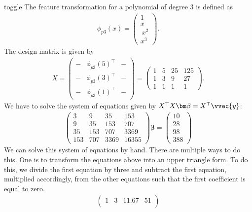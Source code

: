 \documentclass[letterpaper,10pt,english]{jupyterBook}
\begin{document}
\begin{enumerate}
\begin{enumerate}
\begin{sphinxuseclass}{toggle}
\sphinxAtStartPar
The feature transformation for a polynomial of degree 3 is defined as
\begin{equation*}
\begin{split}\phi_{p3}(x)=\begin{pmatrix}
1\\x \\\ x^2 \\ x^3
\end{pmatrix}.\end{split}
\end{equation*}
The design matrix is given by
\begin{align*}
X = \begin{pmatrix}
- & \phi_{p3}(5)^\top & -\\
- & \phi_{p3}(3)^\top & -\\
- & \phi_{p3}(1)^\top & -
\end{pmatrix}
=
\begin{pmatrix}
1 & 5 & 25 & 125\\ 
1 & 3 & 9 & 27\\ 
1 & 1 & 1 & 1
\end{pmatrix}.
\end{align*}
\sphinxAtStartPar
We have to solve the system of equations given by \(X^\top X \bm\beta = X^\top \vvec{y}\):
\begin{align*}
\begin{pmatrix}
3 &     9 &    35 &   153\\
9 &    35 &   153 &   707\\
35&   153 &   707 &  3369\\
153&  707 &  3369 & 16355
\end{pmatrix} \bm\beta = 
\begin{pmatrix}
10\\  28\\  98\\ 388
\end{pmatrix}
\end{align*}
\sphinxAtStartPar
We can solve this system of equations by hand. There are multiple ways to do this. One is to transform the equations above into an upper triangle form. To do this, we divide the first equation by three and subtract the first equation, multiplied accordingly, from the other equations such that the first coefficient is equal to zero.
\begin{align*}
\begin{pmatrix}
1 &    3 &   11.67 &   51\\

\end{pmatrix}
\end{align*}
\end{sphinxuseclass}
\end{enumerate}
\end{enumerate}
\end{document}
